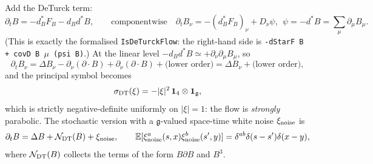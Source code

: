 \documentclass[11pt,a4paper]{article}
\theoremstyle{definition}
\theoremstyle{remark}
\newcommand{\E}{\mathbb{E}}
\newcommand{\g}{\mathfrak{g}}
\begin{document}
Add the DeTurck term:
\begin{equation}\label{eq:dtflow}
\partial_tB=-d_B^*F_B-d_Bd^*B,\qquad\text{componentwise}\quad \partial_tB_\nu=-(d_B^*F_B)_\nu+D_\nu\psi,\ \ \psi=-d^*B=\sum_\mu\partial_\mu B_\mu.
\end{equation}
(This is exactly the formalised \texttt{IsDeTurckFlow}: the right-hand side is \texttt{-dStarF B + covD B $\mu$ (psi B)}.) At the linear level $-d_Bd^*B\simeq+\partial_\nu\partial_\mu B_\mu$, so
\begin{equation}
\partial_tB_\nu=\Delta B_\nu-\partial_\nu(\partial\!\cdot\!B)+\partial_\nu(\partial\!\cdot\!B)+\text{(lower order)}=\Delta B_\nu+\text{(lower order)},
\end{equation}
and the principal symbol becomes
\begin{equation}
\sigma_{\rm DT}(\xi)=-|\xi|^2\,\mathbf 1_{4}\otimes\mathbf 1_{\g},
\end{equation}
which is strictly negative-definite uniformly on $|\xi|=1$: the flow is \emph{strongly} parabolic. The stochastic version with a $\g$-valued space-time white noise $\xi_{\rm noise}$ is
\begin{equation}\label{eq:dtflow-stoch}
\partial_tB=\Delta B+\mathcal N_{\rm DT}(B)+\xi_{\rm noise},\qquad \E[\xi_{\rm noise}^a(s,x)\xi_{\rm noise}^b(s',y)]=\delta^{ab}\delta(s-s')\delta(x-y),
\end{equation}
where $\mathcal N_{\rm DT}(B)$ collects the terms of the form $B\partial B$ and $B^3$.
\end{document}
